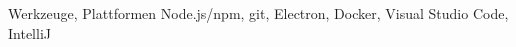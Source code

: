 \cvitem
{
  Werkzeuge, Plattformen
}
{
  Node.js/npm, git, Electron, Docker, Visual Studio Code, IntelliJ
}
